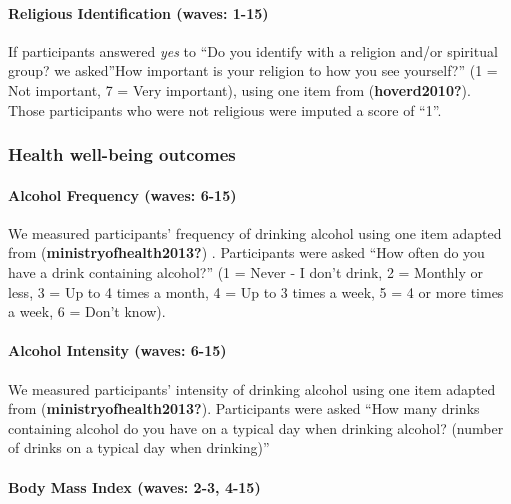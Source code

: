 \documentclass[
  letterpaper,
  DIV=11,
  numbers=noendperiod]{scrartcl}
\let\oldparagraph\paragraph
\renewcommand{\paragraph}[1]{\oldparagraph{#1}\mbox{}}
\begin{document}
\hypertarget{religious-identification-waves-1-15}{%
\paragraph{Religious Identification (waves:
1-15)}\label{religious-identification-waves-1-15}}

If participants answered \emph{yes} to ``Do you identify with a religion
and/or spiritual group? we asked''How important is your religion to how
you see yourself?'' (1 = Not important, 7 = Very important), using one
item from (\textbf{hoverd2010?}). Those participants who were not
religious were imputed a score of ``1''.

\hypertarget{health-well-being-outcomes}{%
\subsubsection{Health well-being
outcomes}\label{health-well-being-outcomes}}

\hypertarget{alcohol-frequency-waves-6-15}{%
\paragraph{Alcohol Frequency (waves:
6-15)}\label{alcohol-frequency-waves-6-15}}

We measured participants' frequency of drinking alcohol using one item
adapted from (\textbf{ministryofhealth2013?}) . Participants were asked
``How often do you have a drink containing alcohol?'' (1 = Never - I
don't drink, 2 = Monthly or less, 3 = Up to 4 times a month, 4 = Up to 3
times a week, 5 = 4 or more times a week, 6 = Don't know).

\hypertarget{alcohol-intensity-waves-6-15}{%
\paragraph{Alcohol Intensity (waves:
6-15)}\label{alcohol-intensity-waves-6-15}}

We measured participants' intensity of drinking alcohol using one item
adapted from (\textbf{ministryofhealth2013?}). Participants were asked
``How many drinks containing alcohol do you have on a typical day when
drinking alcohol? (number of drinks on a typical day when drinking)''

\hypertarget{body-mass-index-waves-2-3-4-15}{%
\paragraph{Body Mass Index (waves: 2-3,
4-15)}\label{body-mass-index-waves-2-3-4-15}}
\end{document}
